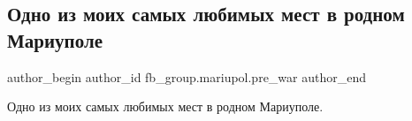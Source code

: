  
 
 
 
 

\subsection{Одно из моих самых любимых мест в родном Мариуполе}
\label{sec:09_02_2023.fb.fb_group.mariupol.pre_war.2.odno_iz_moikh_samikh}

\ifcmt
 author_begin
   author_id fb_group.mariupol.pre_war
 author_end
\fi

Одно из моих самых любимых мест в родном Мариуполе.

